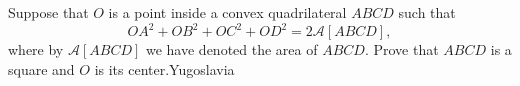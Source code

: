 Suppose that $O$ is a point inside a convex quadrilateral $ABCD$ such that \[ OA^2 + OB^2 + OC^2 + OD^2 = 2\mathcal A[ABCD] , \] where by $\mathcal A[ABCD]$ we have denoted the area of $ABCD$. Prove that $ABCD$ is a square and $O$ is its center.Yugoslavia